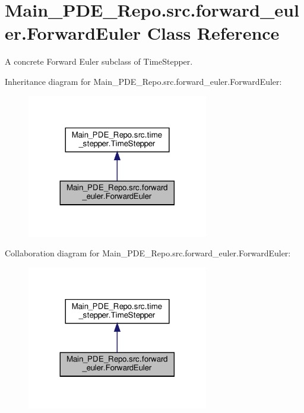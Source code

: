 \hypertarget{classMain__PDE__Repo_1_1src_1_1forward__euler_1_1ForwardEuler}{}\section{Main\+\_\+\+P\+D\+E\+\_\+\+Repo.\+src.\+forward\+\_\+euler.\+Forward\+Euler Class Reference}
\label{classMain__PDE__Repo_1_1src_1_1forward__euler_1_1ForwardEuler}


A concrete Forward Euler subclass of Time\+Stepper.  




Inheritance diagram for Main\+\_\+\+P\+D\+E\+\_\+\+Repo.\+src.\+forward\+\_\+euler.\+Forward\+Euler\+:
\nopagebreak
\begin{figure}[H]
\begin{center}
\leavevmode
\includegraphics[width=224pt]{classMain__PDE__Repo_1_1src_1_1forward__euler_1_1ForwardEuler__inherit__graph}
\end{center}
\end{figure}


Collaboration diagram for Main\+\_\+\+P\+D\+E\+\_\+\+Repo.\+src.\+forward\+\_\+euler.\+Forward\+Euler\+:
\nopagebreak
\begin{figure}[H]
\begin{center}
\leavevmode
\includegraphics[width=224pt]{classMain__PDE__Repo_1_1src_1_1forward__euler_1_1ForwardEuler__coll__graph}
\end{center}
\end{figure}
